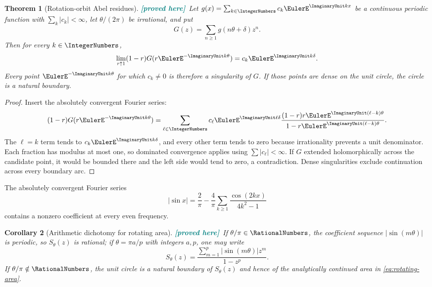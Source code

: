 \documentclass[11pt,oneside]{article}
\newtheorem{theorem}{Theorem}[section]
\newtheorem{corollary}[theorem]{Corollary}
\theoremstyle{definition}
\theoremstyle{remark}
\newcommand{\New}{\textcolor{teal}{\textbf{[proved here]}}}
\begin{document}
\begin{theorem}[Rotation-orbit Abel residues]
\label{thm:abel-residues}
\New\ Let $g(x)=\sum_{k\in\IntegerNumbers}c_k\EulerE^{\ImaginaryUnit kx}$ be a continuous periodic
function with $\sum_k|c_k|<\infty$, let $\theta/(2\pi)$ be irrational, and put
\begin{equation}
 G(z)=\sum_{n\ge1}g(n\theta+\delta)z^n.
 \label{eq:orbit-generating}
\end{equation}
Then for every $k\in\IntegerNumbers$,
\begin{equation}
 \lim_{r\uparrow1}(1-r)G(r\EulerE^{-\ImaginaryUnit k\theta})
 =c_k\EulerE^{\ImaginaryUnit k\delta}.
 \label{eq:abel-residue}
\end{equation}
Every point $\EulerE^{-\ImaginaryUnit k\theta}$ for which $c_k\ne0$ is therefore a singularity
of $G$.  If those points are dense on the unit circle, the circle is a natural
boundary.
\end{theorem}

\begin{proof}
Insert the absolutely convergent Fourier series:
\[
 (1-r)G(r\EulerE^{-\ImaginaryUnit k\theta})
 =\sum_{\ell\in\IntegerNumbers}c_\ell\EulerE^{\ImaginaryUnit\ell\delta}
 \frac{(1-r)r\EulerE^{\ImaginaryUnit(\ell-k)\theta}}
      {1-r\EulerE^{\ImaginaryUnit(\ell-k)\theta}}.
\]
The $\ell=k$ term tends to $c_k\EulerE^{\ImaginaryUnit k\delta}$, and every other term tends to
zero because irrationality prevents a unit denominator.  Each fraction has
modulus at most one, so dominated convergence applies using
$\sum|c_\ell|<\infty$.  If $G$ extended holomorphically across the candidate
point, it would be bounded there and the left side would tend to zero, a
contradiction.  Dense singularities exclude continuation across every boundary
arc.
\end{proof}

The absolutely convergent Fourier series
\begin{equation}
 |\sin x|=\frac{2}{\pi}-\frac{4}{\pi}\sum_{k\ge1}
 \frac{\cos(2kx)}{4k^2-1}
 \label{eq:absolute-sine-fourier}
\end{equation}
contains a nonzero coefficient at every even frequency.

\begin{corollary}[Arithmetic dichotomy for rotating area]
\label{cor:natural-boundary}
\New\ If $\theta/\pi\in\RationalNumbers$, the coefficient sequence
$|\sin(m\theta)|$ is periodic, so $S_\theta(z)$ is rational; if
$\theta=\pi a/p$ with integers $a,p$, one may write
\begin{equation}
 S_\theta(z)=
 \frac{\sum_{m=1}^{p}|\sin(m\theta)|z^m}{1-z^p}.
 \label{eq:rational-area-series}
\end{equation}
If $\theta/\pi\notin\RationalNumbers$, the unit circle is a natural boundary of
$S_\theta(z)$ and hence of the analytically continued area in
\eqref{eq:rotating-area}.
\end{corollary}
\end{document}
